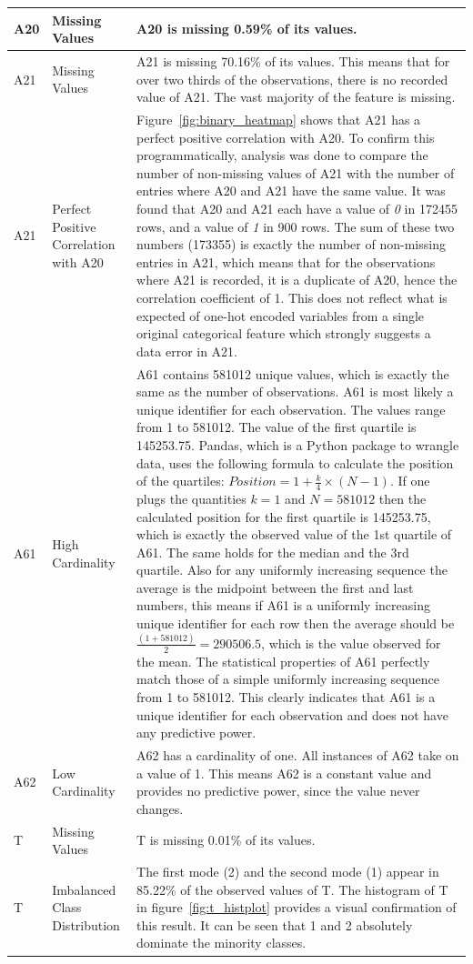 \documentclass[11pt]{report}
\begin{document}
\begin{longtable}{lp{4cm}p{7cm}}
\midrule
A20 & Missing Values & A20 is missing 0.59\% of its values. \\
\midrule
A21 & Missing Values & A21 is missing 70.16\% of its values. This means that for over two thirds of the observations, there is no recorded value of A21. The vast majority of the feature is missing. \\
\midrule
A21 & Perfect Positive Correlation with A20 & Figure~\ref{fig:binary_heatmap} shows that A21 has a perfect positive correlation with A20. To confirm this programmatically, analysis was done to compare the number of non-missing values of A21 with the number of entries where A20 and A21 have the same value. It was found that A20 and A21 each have a value of \textit{0} in 172455 rows, and a value of \textit{1} in 900 rows. The sum of these two numbers (173355) is exactly the number of non-missing entries in A21, which means that for the observations where A21 is recorded, it is a duplicate of A20, hence the correlation coefficient of 1. This does not reflect what is expected of one-hot encoded variables from a single original categorical feature which strongly suggests a data error in A21. \\
\midrule
A61 & High Cardinality & A61 contains 581012 unique values, which is exactly the same as the number of observations. A61 is most likely a unique identifier for each observation. The values range from 1 to 581012. The value of the first quartile is 145253.75. Pandas, which is a Python package to wrangle data, uses the following formula to calculate the position of the quartiles: $Position = 1 + \frac{k}{4} \times (N - 1)$. If one plugs the quantities $k = 1$ and $N = 581012$ then the calculated position for the first quartile is 145253.75, which is exactly the observed value of the 1st quartile of A61. The same holds for the median and the 3rd quartile. Also for any uniformly increasing sequence the average is the midpoint between the first and last numbers, this means if A61 is a uniformly increasing unique identifier for each row then the average should be $\frac{(1 + 581012)}{2} = 290506.5$, which is the value observed for the mean. The statistical properties of A61 perfectly match those of a simple uniformly increasing sequence from 1 to 581012. This clearly indicates that A61 is a unique identifier for each observation and does not have any predictive power. \\
\midrule
A62 & Low Cardinality & A62 has a cardinality of one. All instances of A62 take on a value of 1. This means A62 is a constant value and provides no predictive power, since the value never changes. \\
\midrule
T & Missing Values & T is missing 0.01\% of its values. \\
\midrule
T & Imbalanced Class Distribution & The first mode (2) and the second mode (1) appear in 85.22\% of the observed values of T. The histogram of T in figure~\ref{fig:t_histplot} provides a visual confirmation of this result. It can be seen that 1 and 2 absolutely dominate the minority classes.
\end{longtable}
\end{document}
